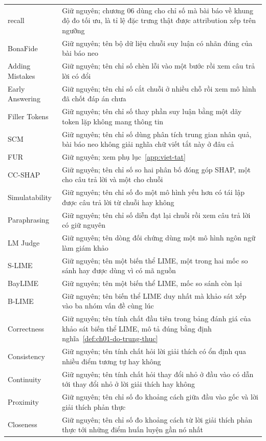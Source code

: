 \begin{longtable}{@{}lp{7cm}@{}}
recall & Giữ nguyên; chương 06 dùng cho chỉ số mà bài báo về khung độ đo tối ưu, là tỉ lệ đặc trưng thật được attribution xếp trên ngưỡng \\
BonaFide & Giữ nguyên; tên bộ dữ liệu chuỗi suy luận có nhãn đúng của bài báo neo \\
Adding Mistakes & Giữ nguyên; tên chỉ số chèn lỗi vào một bước rồi xem câu trả lời có đổi \\
Early Answering & Giữ nguyên; tên chỉ số cắt chuỗi ở nhiều chỗ rồi xem mô hình đã chốt đáp án chưa \\
Filler Tokens & Giữ nguyên; tên chỉ số thay phần suy luận bằng một dãy token lặp không mang thông tin \\
SCM & Giữ nguyên; tên chỉ số dùng phân tích trung gian nhân quả, bài báo neo không giải nghĩa chữ viết tắt này ở đâu cả \\
FUR & Giữ nguyên; xem phụ lục~\ref{app:viet-tat} \\
CC-SHAP & Giữ nguyên; tên chỉ số so hai phân bố đóng góp SHAP, một cho câu trả lời và một cho chuỗi \\
Simulatability & Giữ nguyên; tên chỉ số đo một mô hình yếu hơn có tái lập được câu trả lời từ chuỗi hay không \\
Paraphrasing & Giữ nguyên; tên chỉ số diễn đạt lại chuỗi rồi xem câu trả lời có giữ nguyên \\
LM Judge & Giữ nguyên; tên dòng đối chứng dùng một mô hình ngôn ngữ làm giám khảo \\
S-LIME & Giữ nguyên; tên một biến thể LIME, một trong hai mốc so sánh hay được dùng vì có mã nguồn \\
BayLIME & Giữ nguyên; tên một biến thể LIME, mốc so sánh còn lại \\
B-LIME & Giữ nguyên; tên biến thể LIME duy nhất mà khảo sát xếp vào ba nhóm vấn đề cùng lúc \\
Correctness & Giữ nguyên; tên tính chất đầu tiên trong bảng đánh giá của khảo sát biến thể LIME, mô tả đúng bằng định nghĩa~\ref{def:ch01-do-trung-thuc} \\
Consistency & Giữ nguyên; tên tính chất hỏi lời giải thích có ổn định qua nhiều điểm tương tự hay không \\
Continuity & Giữ nguyên; tên tính chất hỏi thay đổi nhỏ ở đầu vào có dẫn tới thay đổi nhỏ ở lời giải thích hay không \\
Proximity & Giữ nguyên; tên chỉ số đo khoảng cách giữa đầu vào gốc và lời giải thích phản thực \\
Closeness & Giữ nguyên; tên chỉ số đo khoảng cách từ lời giải thích phản thực tới những điểm huấn luyện gần nó nhất \\

\end{longtable}
